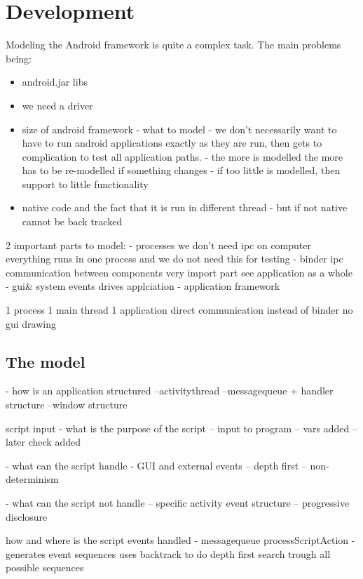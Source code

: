 \documentclass{acm_proc_article-sp}
\begin{document}
\section{Development}

Modeling the Android framework is quite a complex task. The main problems being:
\begin{itemize}
 \item android.jar libs
\item we need a driver 
 \item size of android framework - what to model
  - we don't necessarily want to have to run android applications exactly as they are run, then gets to complication to test all application
  paths.
   - the more is modelled the more has to be re-modelled if something changes
   - if too little is modelled, then support to little functionality

\item native code and the fact that it is run in different thread - but if not native cannot be back tracked





\end{itemize}


2 important parts to model:
- processes we don’t need ipc on computer everything runs in one process and we do not need this for testing
- binder ipc communication between components very import part see application as a whole
- gui\& system events drives applciation
- application framework


1 process
1 main thread
1 application
direct communication instead of binder
no gui drawing

\subsection{The model}
- how is an application structured
--activitythread
--messagequeue + handler structure
--window structure


script input
- what is the purpose of the script
-- input to program
-- vars added
-- later check added

- what can the script handle
- GUI and external events
-- depth first
-- non-determinism

- what can the script not handle
-- specific activity event structure
-- progressive disclosure

how and where is the script events handled
- messagequeue processScriptAction
- generates event sequences uses backtrack to do depth first search trough all possible sequences
\newpage
\end{document}
